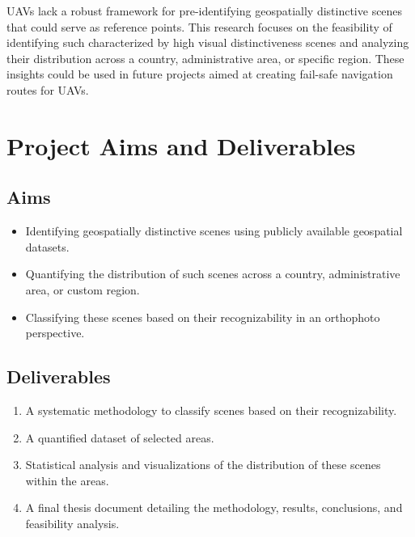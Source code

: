 \documentclass[12pt]{article}
\begin{document}
UAVs lack a robust framework for pre-identifying geospatially distinctive scenes that could serve as reference points. This research focuses on the feasibility of identifying such characterized by high visual distinctiveness scenes and analyzing their distribution across a country, administrative area, or specific region. These insights could be used in future projects aimed at creating fail-safe navigation routes for UAVs.

\section*{Project Aims and Deliverables}
\subsection*{Aims}
\begin{itemize}
    \item Identifying geospatially distinctive scenes using publicly available geospatial datasets.
    \item Quantifying the distribution of such scenes across a country, administrative area, or custom region.
    \item Classifying these scenes based on their recognizability in an orthophoto perspective.
\end{itemize}

\subsection*{Deliverables}
\begin{enumerate}
    \item  A systematic methodology to classify scenes based on their recognizability.
    \item A quantified dataset of selected areas.
    \item Statistical analysis and visualizations of the distribution of these scenes within the areas.
    \item A final thesis document detailing the methodology, results, conclusions, and feasibility analysis.
\end{enumerate}
\end{document}

